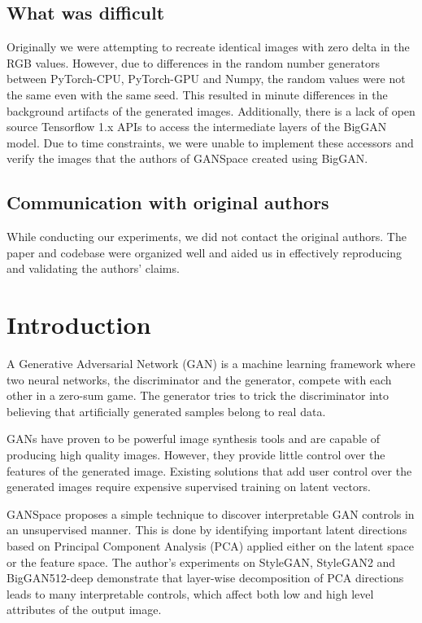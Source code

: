 \subsection*{What was difficult}

Originally we were attempting to recreate identical images with zero delta in the RGB values. However, due to differences in the random number generators between PyTorch-CPU, PyTorch-GPU and Numpy, the random values were not the same even with the same seed. This resulted in minute differences in the background artifacts of the generated images. Additionally, there is a lack of open source Tensorflow 1.x APIs to access the intermediate layers of the BigGAN model. Due to time constraints, we were unable to implement these accessors and verify the images that the authors of GANSpace created using BigGAN.

\subsection*{Communication with original authors}

While conducting our experiments, we did not contact the original authors. The paper and codebase were organized well and aided us in effectively reproducing and validating the authors' claims.

\newpage

\section{Introduction}

A Generative Adversarial Network (GAN)\cite{gan} is a machine learning framework where two neural networks, the discriminator and the generator, compete with each other in a zero-sum game. The generator tries to trick the discriminator into believing that artificially generated samples belong to real data.

GANs have proven to be powerful image synthesis tools and are capable of producing high quality images. However, they provide little control over the features of the generated image. Existing solutions\cite{supervised} that add user control over the generated images require expensive supervised training on latent vectors.

GANSpace\cite{GANSpace} proposes a simple technique to discover interpretable GAN controls in an unsupervised manner. This is done by identifying important latent directions based on Principal Component Analysis (PCA) applied either on the latent space or the feature space. The author's experiments on StyleGAN\cite{stylegan}, StyleGAN2\cite{stylegan2} and BigGAN512-deep\cite{biggan} demonstrate that layer-wise decomposition of PCA directions leads to many interpretable controls, which affect both low and high level attributes of the output image.


